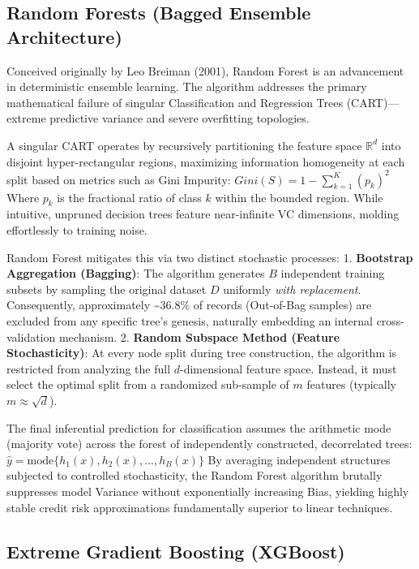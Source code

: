 \hypertarget{random-forests-bagged-ensemble-architecture}{%
\subsection{Random Forests (Bagged Ensemble
Architecture)}\label{random-forests-bagged-ensemble-architecture}}

Conceived originally by Leo Breiman (2001), Random Forest is an
advancement in deterministic ensemble learning. The algorithm addresses
the primary mathematical failure of singular Classification and
Regression Trees (CART)---extreme predictive variance and severe
overfitting topologies.

A singular CART operates by recursively partitioning the feature space
\(\mathbb{R}^d\) into disjoint hyper-rectangular regions, maximizing
information homogeneity at each split based on metrics such as Gini
Impurity: \(Gini(S) = 1 - \sum_{k=1}^{K} (p_k)^2\) Where \(p_k\) is the
fractional ratio of class \(k\) within the bounded region. While
intuitive, unpruned decision trees feature near-infinite VC dimensions,
molding effortlessly to training noise.

Random Forest mitigates this via two distinct stochastic processes: 1.
\textbf{Bootstrap Aggregation (Bagging)}: The algorithm generates \(B\)
independent training subsets by sampling the original dataset \(D\)
uniformly \emph{with replacement}. Consequently, approximately
\textasciitilde36.8\% of records (Out-of-Bag samples) are excluded from
any specific tree's genesis, naturally embedding an internal
cross-validation mechanism. 2. \textbf{Random Subspace Method (Feature
Stochasticity)}: At every node split during tree construction, the
algorithm is restricted from analyzing the full \(d\)-dimensional
feature space. Instead, it must select the optimal split from a
randomized sub-sample of \(m\) features (typically
\(m \approx \sqrt{d}\)).

The final inferential prediction for classification assumes the
arithmetic mode (majority vote) across the forest of independently
constructed, decorrelated trees:
\(\hat{y} = \text{mode} \{h_1(x), h_2(x), ..., h_B(x)\}\) By averaging
independent structures subjected to controlled stochasticity, the Random
Forest algorithm brutally suppresses model Variance without
exponentially increasing Bias, yielding highly stable credit risk
approximations fundamentally superior to linear techniques.

\hypertarget{extreme-gradient-boosting-xgboost}{%
\subsection{Extreme Gradient Boosting
(XGBoost)}\label{extreme-gradient-boosting-xgboost}}

